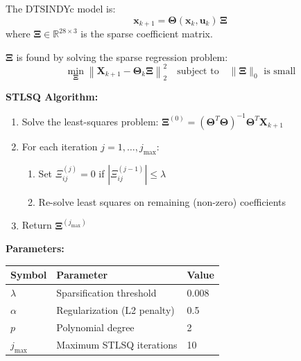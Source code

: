 \documentclass[11pt,a4paper]{article}
\begin{document}
\begin{equationbox}
The DTSINDYc model is:
\begin{equation}
    \mathbf{x}_{k+1} = \bm{\Theta}(\mathbf{x}_k, \mathbf{u}_k) \,\bm{\Xi}
    \label{eq:sindy_model}
\end{equation}
where $\bm{\Xi} \in \mathbb{R}^{28 \times 3}$ is the sparse coefficient matrix.

$\bm{\Xi}$ is found by solving the sparse regression problem:
\begin{equation}
    \min_{\bm{\Xi}} \left\| \mathbf{X}_{k+1} - \bm{\Theta}_k \bm{\Xi} \right\|_2^2
    \quad\text{subject to}\quad \|\bm{\Xi}\|_0 \text{ is small}
    \label{eq:stlsq_objective}
\end{equation}

\textbf{STLSQ Algorithm:}
\begin{enumerate}
    \item Solve the least-squares problem: $\bm{\Xi}^{(0)} = (\bm{\Theta}^T\bm{\Theta})^{-1}\bm{\Theta}^T \mathbf{X}_{k+1}$
    \item For each iteration $j = 1, \ldots, j_{\max}$:
    \begin{enumerate}
        \item Set $\Xi_{ij}^{(j)} = 0$ if $|\Xi_{ij}^{(j-1)}| \leq \lambda$ \quad {\small\textcolor{rosepink}{(threshold sparsification)}}
        \item Re-solve least squares on remaining (non-zero) coefficients
    \end{enumerate}
    \item Return $\bm{\Xi}^{(j_{\max})}$
\end{enumerate}

\textbf{Parameters:}
\begin{center}
\begin{tabular}{lll}
\toprule
\textbf{Symbol} & \textbf{Parameter} & \textbf{Value} \\
\midrule
$\lambda$ & Sparsification threshold & 0.008 \\
$\alpha$ & Regularization (L2 penalty) & 0.5 \\
$p$ & Polynomial degree & 2 \\
$j_{\max}$ & Maximum STLSQ iterations & 10 \\
\bottomrule
\end{tabular}
\end{center}
\end{equationbox}
\end{document}
